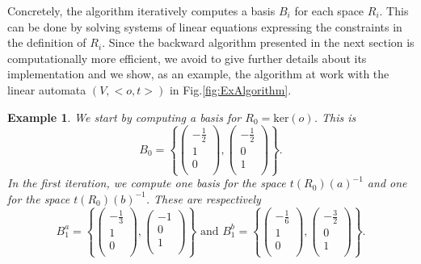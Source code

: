 \documentclass[3p]{elsarticle}
\newcommand{\kernel}{\mathrm{ker}} %
\newtheorem{example}{Example}
\begin{document}
Concretely, the algorithm iteratively computes a basis $B_i$ for
each space $R_i$. This can be done by solving systems of linear
equations expressing the constraints in the definition of $R_i$.
Since the backward algorithm presented in the next section is
computationally more efficient, we avoid to give further details
about its implementation and we show, as an example, the algorithm
at work with the linear automata $(V,<o,t>)$ in
Fig.\ref{fig:ExAlgorithm}.


\begin{example}\label{ex:ForwardAlg}
We start by computing  a basis for $R_0=\kernel(o)$. This is
$$B_0=\left\{ \left(%
\begin{array}{c}
  -\frac{1}{2} \\
  1\\
  0 \\
\end{array}\right),
%
\left(%
\begin{array}{c}
  -\frac{1}{2} \\
  0\\
  1 \\
\end{array}\right)
%
\right \}\text{.}
$$
In the first iteration, we compute one basis for the space
$t(R_0)(a)^{-1}$ and one for the space $t(R_0)(b)^{-1}$. These are
respectively
$$B_1^a=\left\{ \left(%
\begin{array}{c}
  -\frac{1}{3} \\
  1\\
  0 \\
\end{array}\right),
%
\left(%
\begin{array}{c}
  -1 \\
  0\\
  1 \\
\end{array}\right)
%
\right \}
%
\text{ and }
%
B_1^b=\left\{ \left(%
\begin{array}{c}
  -\frac{1}{6} \\
  1\\
  0 \\
\end{array}\right),
%
\left(%
\begin{array}{c}
  -\frac{3}{2} \\
  0\\
  1 \\
\end{array}\right)
%
\right \}
%
\text{.}$$

\end{example}
\end{document}
